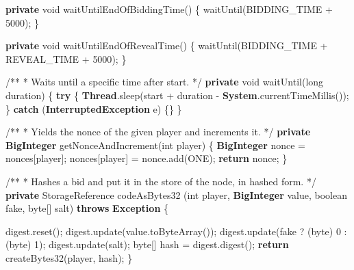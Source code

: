 \documentclass[a4paper,]{book}
\newenvironment{Shaded}{\begin{snugshade}}{\end{snugshade}}
\newcommand{\BuiltInTok}[1]{\textcolor[rgb]{0.39,0.29,0.61}{\textbf{#1}}}
\newcommand{\CommentTok}[1]{\textcolor[rgb]{0.54,0.53,0.53}{#1}}
\newcommand{\DataTypeTok}[1]{\textcolor[rgb]{0.00,0.34,0.68}{#1}}
\newcommand{\DecValTok}[1]{\textcolor[rgb]{0.69,0.50,0.00}{#1}}
\newcommand{\FunctionTok}[1]{\textcolor[rgb]{0.39,0.29,0.61}{#1}}
\newcommand{\KeywordTok}[1]{\textcolor[rgb]{0.12,0.11,0.11}{\textbf{#1}}}
\newcommand{\NormalTok}[1]{\textcolor[rgb]{0.12,0.11,0.11}{#1}}
\renewenvironment{Shaded}{\begin{snugshade}\small}{\end{snugshade}}
\begin{document}
{\begin{Shaded}
\begin{Highlighting}[]
  \KeywordTok{private} \DataTypeTok{void} \FunctionTok{waitUntilEndOfBiddingTime}\NormalTok{() \{}
     \FunctionTok{waitUntil}\NormalTok{(BIDDING_TIME + }\DecValTok{5000}\NormalTok{);}
\NormalTok{  \}}

  \KeywordTok{private} \DataTypeTok{void} \FunctionTok{waitUntilEndOfRevealTime}\NormalTok{() \{}
    \FunctionTok{waitUntil}\NormalTok{(BIDDING_TIME + REVEAL_TIME + }\DecValTok{5000}\NormalTok{);}
\NormalTok{  \}}

  \CommentTok{/**}
   \CommentTok{*}\NormalTok{ Waits until a specific time after start}\CommentTok{.}
   \CommentTok{*/}
  \KeywordTok{private} \DataTypeTok{void} \FunctionTok{waitUntil}\NormalTok{(}\DataTypeTok{long}\NormalTok{ duration) \{}
    \KeywordTok{try}\NormalTok{ \{}
      \BuiltInTok{Thread}\NormalTok{.}\FunctionTok{sleep}\NormalTok{(start + duration - }\BuiltInTok{System}\NormalTok{.}\FunctionTok{currentTimeMillis}\NormalTok{());}
\NormalTok{    \}}
    \KeywordTok{catch}\NormalTok{ (}\BuiltInTok{InterruptedException}\NormalTok{ e) \{\}}
\NormalTok{  \}}

  \CommentTok{/**}
   \CommentTok{*}\NormalTok{ Yields the nonce of the given player and increments it}\CommentTok{.}
   \CommentTok{*/}
  \KeywordTok{private} \BuiltInTok{BigInteger} \FunctionTok{getNonceAndIncrement}\NormalTok{(}\DataTypeTok{int}\NormalTok{ player) \{}
    \BuiltInTok{BigInteger}\NormalTok{ nonce = nonces[player];}
\NormalTok{    nonces[player] = nonce.}\FunctionTok{add}\NormalTok{(ONE);}
    \KeywordTok{return}\NormalTok{ nonce;}
\NormalTok{  \}}

  \CommentTok{/**}
   \CommentTok{*}\NormalTok{ Hashes a bid and put it in the store of the node}\CommentTok{,}\NormalTok{ in hashed form}\CommentTok{.}
   \CommentTok{*/}
  \KeywordTok{private}\NormalTok{ StorageReference codeAsBytes32}
\NormalTok{      (}\DataTypeTok{int}\NormalTok{ player, }\BuiltInTok{BigInteger}\NormalTok{ value, }\DataTypeTok{boolean}\NormalTok{ fake, }\DataTypeTok{byte}\NormalTok{[] salt)}
      \KeywordTok{throws} \BuiltInTok{Exception}\NormalTok{ \{}

\NormalTok{    digest.}\FunctionTok{reset}\NormalTok{();}
\NormalTok{    digest.}\FunctionTok{update}\NormalTok{(value.}\FunctionTok{toByteArray}\NormalTok{());}
\NormalTok{    digest.}\FunctionTok{update}\NormalTok{(fake ? (}\DataTypeTok{byte}\NormalTok{) }\DecValTok{0}\NormalTok{ : (}\DataTypeTok{byte}\NormalTok{) }\DecValTok{1}\NormalTok{);}
\NormalTok{    digest.}\FunctionTok{update}\NormalTok{(salt);}
    \DataTypeTok{byte}\NormalTok{[] hash = digest.}\FunctionTok{digest}\NormalTok{();}
    \KeywordTok{return} \FunctionTok{createBytes32}\NormalTok{(player, hash);}
\NormalTok{  \}}


\end{Highlighting}
\end{Shaded}}
\end{document}
